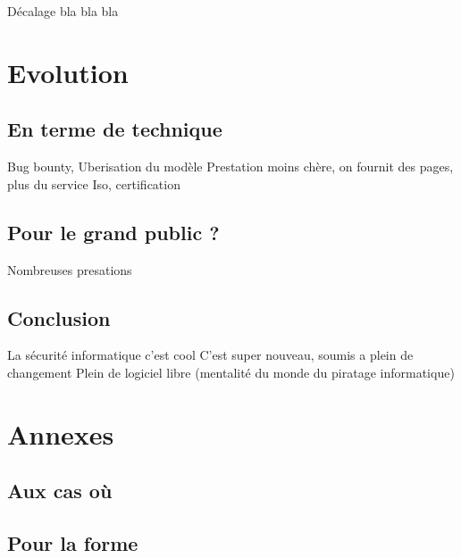 \documentclass[a4paper]{memoir}
\begin{document}
Décalage bla bla bla

\part{Evolution}

\chapter{En terme de technique}

Bug bounty, Uberisation du modèle
Prestation moins chère, on fournit des pages, plus du service
Iso, certification

\chapter{Pour le grand public ?}

Nombreuses presations


\chapter*{Conclusion}

La sécurité informatique c'est cool
C'est super nouveau, soumis a plein de changement
Plein de logiciel libre (mentalité du monde du piratage informatique)


\part*{Annexes}
\appendix

\chapter{Aux cas où}

\chapter{Pour la forme}


\backmatter%

\nocite{*}



\printindex
\end{document}
